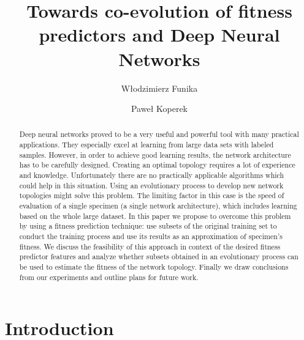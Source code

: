 \documentclass{llncs}
\begin{document}
\mainmatter

\title{Towards co-evolution of fitness predictors and Deep Neural Networks}

\author{Włodzimierz Funika \and Paweł Koperek}


\maketitle

\begin{abstract}
 
    Deep neural networks proved to be a very useful and powerful tool with many practical applications. They especially excel at learning from large data sets with labeled samples. However, in order to achieve good learning results, the network architecture has to be carefully designed. Creating an optimal topology requires a lot of experience and knowledge. Unfortunately there are no practically applicable algorithms which could help in this situation. Using an evolutionary process to develop new network topologies might solve this problem. The limiting factor in this case is the speed of evaluation of a single specimen (a single network architecture), which includes learning based on the whole large dataset. In this paper we propose to overcome this problem by using a fitness prediction technique: use subsets of the original training set to conduct the training process and use its results as an approximation of specimen's fitness. We discuss the feasibility of this approach in context of the desired fitness predictor features and analyze whether subsets obtained in an evolutionary process can be used to estimate the fitness of the network topology. Finally we draw conclusions from our experiments and outline plans for future work.

\end{abstract}

\section{Introduction}
\end{document}

